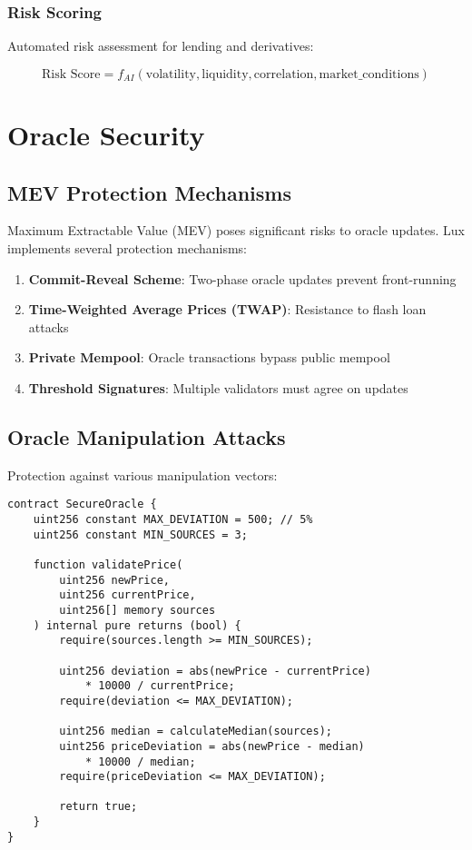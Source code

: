\documentclass[11pt]{article}
\begin{document}
\subsubsection{Risk Scoring}
Automated risk assessment for lending and derivatives:

\begin{equation}
\text{Risk Score} = f_{AI}(\text{volatility}, \text{liquidity}, \text{correlation}, \text{market\_conditions})
\end{equation}

\section{Oracle Security}

\subsection{MEV Protection Mechanisms}

Maximum Extractable Value (MEV) poses significant risks to oracle updates. Lux implements several protection mechanisms:

\begin{enumerate}
    \item \textbf{Commit-Reveal Scheme}: Two-phase oracle updates prevent front-running
    \item \textbf{Time-Weighted Average Prices (TWAP)}: Resistance to flash loan attacks
    \item \textbf{Private Mempool}: Oracle transactions bypass public mempool
    \item \textbf{Threshold Signatures}: Multiple validators must agree on updates
\end{enumerate}

\subsection{Oracle Manipulation Attacks}

Protection against various manipulation vectors:

\begin{lstlisting}[caption={Oracle Manipulation Protection}]
contract SecureOracle {
    uint256 constant MAX_DEVIATION = 500; // 5%
    uint256 constant MIN_SOURCES = 3;
    
    function validatePrice(
        uint256 newPrice,
        uint256 currentPrice,
        uint256[] memory sources
    ) internal pure returns (bool) {
        require(sources.length >= MIN_SOURCES);
        
        uint256 deviation = abs(newPrice - currentPrice) 
            * 10000 / currentPrice;
        require(deviation <= MAX_DEVIATION);
        
        uint256 median = calculateMedian(sources);
        uint256 priceDeviation = abs(newPrice - median) 
            * 10000 / median;
        require(priceDeviation <= MAX_DEVIATION);
        
        return true;
    }
}
\end{lstlisting}
\end{document}
